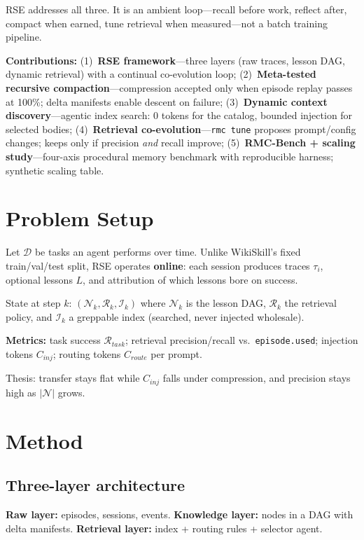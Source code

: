 \documentclass[11pt]{article}
\begin{document}
RSE addresses all three.
It is an ambient loop---recall before work, reflect after, compact when earned, tune retrieval when measured---not a batch training pipeline.

\textbf{Contributions:}
(1)~\textbf{RSE framework}---three layers (raw traces, lesson DAG, dynamic retrieval) with a continual co-evolution loop;
(2)~\textbf{Meta-tested recursive compaction}---compression accepted only when episode replay passes at 100\%; delta manifests enable descent on failure;
(3)~\textbf{Dynamic context discovery}---agentic index search: 0 tokens for the catalog, bounded injection for selected bodies;
(4)~\textbf{Retrieval co-evolution}---\texttt{rmc tune} proposes prompt/config changes; keeps only if precision \emph{and} recall improve;
(5)~\textbf{RMC-Bench + scaling study}---four-axis procedural memory benchmark with reproducible harness; synthetic scaling table.

\section{Problem Setup}
\label{sec:setup}

Let $\mathcal{D}$ be tasks an agent performs over time.
Unlike WikiSkill's fixed train/val/test split, RSE operates \textbf{online}: each session produces traces $\tau_i$, optional lessons $L$, and attribution of which lessons bore on success.

State at step $k$: $(\mathcal{N}_k, \mathcal{R}_k, \mathcal{I}_k)$ where $\mathcal{N}_k$ is the lesson DAG, $\mathcal{R}_k$ the retrieval policy, and $\mathcal{I}_k$ a greppable index (searched, never injected wholesale).

\textbf{Metrics:} task success $\mathcal{R}_{task}$; retrieval precision/recall vs.\ \texttt{episode.used}; injection tokens $C_{inj}$; routing tokens $C_{route}$ per prompt.

Thesis: transfer stays flat while $C_{inj}$ falls under compression, and precision stays high as $|\mathcal{N}|$ grows.

\section{Method}
\label{sec:method}

\subsection{Three-layer architecture}

\textbf{Raw layer:} episodes, sessions, events.
\textbf{Knowledge layer:} nodes in a DAG with delta manifests.
\textbf{Retrieval layer:} index + routing rules + selector agent.
\end{document}
